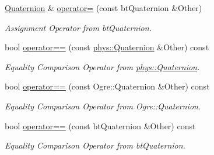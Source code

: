 \begin{DoxyCompactItemize}
\hyperlink{classphys_1_1Quaternion}{Quaternion} \& \hyperlink{classphys_1_1Quaternion_a05e7364791bf7f38ad63dc59184cd5ca}{operator=} (const btQuaternion \&Other)
\begin{DoxyCompactList}\small\item\em Assignment Operator from btQuaternion. \item\end{DoxyCompactList}\item 
bool \hyperlink{classphys_1_1Quaternion_aa02dc20b4246e16017b70788449d7012}{operator==} (const \hyperlink{classphys_1_1Quaternion}{phys::Quaternion} \&Other) const 
\begin{DoxyCompactList}\small\item\em Equality Comparison Operator from \hyperlink{classphys_1_1Quaternion}{phys::Quaternion}. \item\end{DoxyCompactList}\item 
bool \hyperlink{classphys_1_1Quaternion_a75ab11099a0479885ae5f42945621ef9}{operator==} (const Ogre::Quaternion \&Other) const 
\begin{DoxyCompactList}\small\item\em Equality Comparison Operator from Ogre::Quaternion. \item\end{DoxyCompactList}\item 
bool \hyperlink{classphys_1_1Quaternion_a652ec257cb1ab788db646b85f3f89af3}{operator==} (const btQuaternion \&Other) const 
\begin{DoxyCompactList}\small\item\em Equality Comparison Operator from btQuaternion. \item\end{DoxyCompactList}\end{DoxyCompactItemize}

